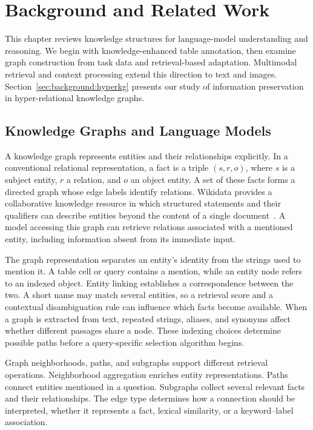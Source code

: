 \chapter{Background and Related Work}
\label{ch:background}

This chapter reviews knowledge structures for language-model understanding and reasoning. We begin with knowledge-enhanced table annotation, then examine graph construction from task data and retrieval-based adaptation. Multimodal retrieval and context processing extend this direction to text and images. Section~\ref{sec:background:hyperkg} presents our study of information preservation in hyper-relational knowledge graphs.

\section{Knowledge Graphs and Language Models}
\label{sec:background:knowledge-models}

A knowledge graph represents entities and their relationships explicitly. In a conventional relational representation, a fact is a triple $(s,r,o)$, where $s$ is a subject entity, $r$ a relation, and $o$ an object entity. A set of these facts forms a directed graph whose edge labels identify relations. Wikidata provides a collaborative knowledge resource in which structured statements and their qualifiers can describe entities beyond the content of a single document~\cite{bg-wikidata}. A model accessing this graph can retrieve relations associated with a mentioned entity, including information absent from its immediate input.

The graph representation separates an entity's identity from the strings used to mention it. A table cell or query contains a mention, while an entity node refers to an indexed object. Entity linking establishes a correspondence between the two. A short name may match several entities, so a retrieval score and a contextual disambiguation rule can influence which facts become available. When a graph is extracted from text, repeated strings, aliases, and synonyms affect whether different passages share a node. These indexing choices determine possible paths before a query-specific selection algorithm begins.

Graph neighborhoods, paths, and subgraphs support different retrieval operations. Neighborhood aggregation enriches entity representations. Paths connect entities mentioned in a question. Subgraphs collect several relevant facts and their relationships. The edge type determines how a connection should be interpreted, whether it represents a fact, lexical similarity, or a keyword--label association.

